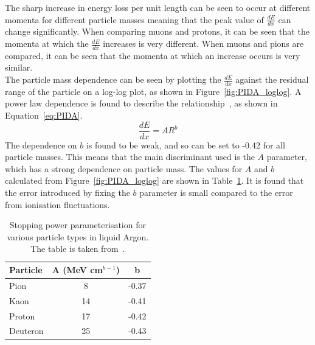 The sharp increase in energy loss per unit length can be seen to occur at different momenta for different particle masses meaning that the peak value of $\frac{dE}{dx}$ can change significantly. When comparing muons and protons, it can be seen that the momenta at which the $\frac{dE}{dx}$ increases is very different. When muons and pions are compared, it can be seen that the momenta at which an increase occurs is very similar. \\

The particle mass dependence can be seen by plotting the $\frac{dE}{dx}$ against the residual range of the particle on a log-log plot, as shown in Figure~\ref{fig:PIDA_loglog}. A power law dependence is found to describe the relationship~\citep{PIDA_Paper}, as shown in Equation~\ref{eq:PIDA}.
\begin{equation}
  \label{eq:PIDA}
  \frac{dE}{dx} = A R^b
\end{equation}
The dependence on $b$ is found to be weak, and so can be set to -0.42 for all particle masses. This means that the main discriminant used is the $A$ parameter, which has a strong dependence on particle mass. The values for $A$ and $b$ calculated from Figure~\ref{fig:PIDA_loglog} are shown in Table~\ref{tab:PIDAVals}. It is found that the error introduced by fixing the $b$ parameter is small compared to the error from ionisation fluctuations. \\

\begin{table}
\caption[Stopping power parameterisation for various particle types in liquid Argon]
        {Stopping power parameterisation for various particle types in liquid Argon. The table is taken from~\citep{PIDA_Paper}.}
\centering
\label{tab:PIDAVals}
\begin{tabular}{l c c}
\toprule
{Particle} & {A (MeV cm$^{b-1}$)} & {b} \\ 
\midrule
Pion     & 8  & -0.37 \\

Kaon     & 14 & -0.41 \\

Proton   & 17 & -0.42 \\

Deuteron & 25 & -0.43 \\
\bottomrule
\end{tabular}
\end{table}

